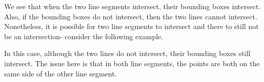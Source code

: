 \documentclass[a4paper, openany]{memoir}
\begin{document}
\noindent We see that when the two line segments intersect, their bounding boxes intersect. Also, if the bounding boxes do not intersect, then the two lines cannot intersect. Nonetheless, it is possible for two line segments to intersect and there to still not be an intersection- consider the following example.
\begin{figure}[H]
    \centering
\end{figure}
\noindent In this case, although the two lines do not intersect, their bounding boxes still intersect. The issue here is that in both line segments, the points are both on the same side of the other line segment.
\end{document}
